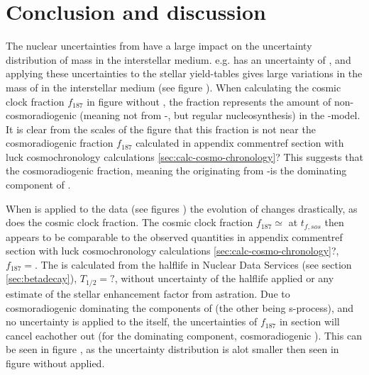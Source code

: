 \chapter{Conclusion and discussion}
\label{sec:conclusion}

The nuclear uncertainties from  have a large impact on the uncertainty distribution of mass in the interstellar medium. e.g.  has an uncertainty of , and applying these uncertainties to the stellar yield-tables gives large variations in the mass of  in the interstellar medium (see figure ).
When calculating the cosmic clock fraction $f_{187}$ in figure  without \betadecay, the fraction represents the amount of non-cosmoradiogenic  (meaning not from -\betadecay, but regular nucleosynthesis) in the \omegamodel-model.
It is clear from the scales of the figure that this fraction is not near the cosmoradiogenic fraction $f_{187}$ calculated in appendix comment{ref section with luck cosmochronology calculations \ref{sec:calc-cosmo-chronology}?}
This suggests that the cosmoradiogenic fraction, meaning the  originating from -\betadecay is the dominating component of .

When \betadecay is applied to the data (see figures ) the evolution of  changes drastically, as does the cosmic clock fraction. The cosmic clock fraction $f_{187}\simeq$ at $t_{f,sos}$ then appears to be comparable to the observed quantities in appendix comment{ref section with luck cosmochronology calculations \ref{sec:calc-cosmo-chronology}?}, $f_{187}=$.
The \betadecay is calculated from the halflife in Nuclear Data Services (see section \ref{sec:betadecay}), $T_{1/2}=?$, without uncertainty of the halflife applied or any estimate of the stellar enhancement factor from astration.
Due to cosmoradiogenic  dominating the components of  (the other being s-process), and no uncertainty is applied to the \betadecay itself, the uncertainties of $f_{187}$ in section  will cancel eachother out (for the dominating component, cosmoradiogenic ).
This can be seen in figure , as the uncertainty distribution is alot smaller then seen in figure  without \betadecay applied.

